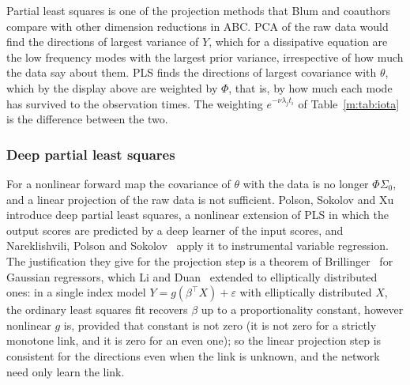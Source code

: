 \begin{remark}\label{m:rem:plspca}
Partial least squares is one of the projection methods that Blum and coauthors~\cite{blum2013} compare with other dimension reductions in ABC. PCA of the raw data would find the directions of largest variance of $Y$, which for a dissipative equation are the low frequency modes with the largest prior variance, irrespective of how much the data say about them. PLS finds the directions of largest covariance with $\theta$, which by the display above are weighted by $\Phi$, that is, by how much each mode has survived to the observation times. The weighting $e^{-\nu\lambda_jt_i}$ of Table~\ref{m:tab:iota} is the difference between the two.
\end{remark}

\subsubsection{Deep partial least squares} For a nonlinear forward map the covariance of $\theta$ with the data is no longer $\Phi\Sigma_0$, and a linear projection of the raw data is not sufficient. Polson, Sokolov and Xu~\cite{polsonsokolovxu2021} introduce deep partial least squares, a nonlinear extension of PLS in which the output scores are predicted by a deep learner of the input scores, and Nareklishvili, Polson and Sokolov~\cite{nareklishvili2023} apply it to instrumental variable regression. The justification they give for the projection step is a theorem of Brillinger~\cite{brillinger2012} for Gaussian regressors, which Li and Duan~\cite{liduan1989} extended to elliptically distributed ones: in a single index model $Y=g(\beta^\top X)+\varepsilon$ with elliptically distributed $X$, the ordinary least squares fit recovers $\beta$ up to a proportionality constant, however nonlinear $g$ is, provided that constant is not zero (it is not zero for a strictly monotone link, and it is zero for an even one); so the linear projection step is consistent for the directions even when the link is unknown, and the network need only learn the link.


